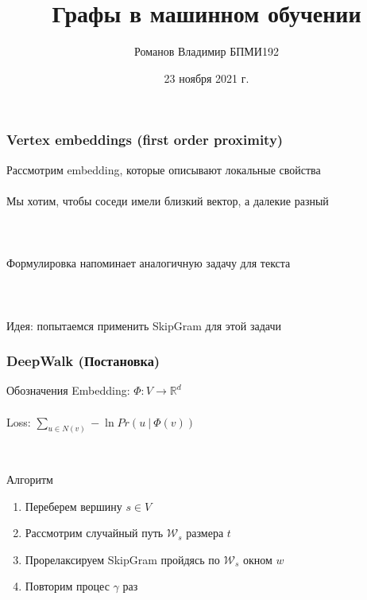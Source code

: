 \documentclass{beamer}
\title{Графы в машинном обучении}
\author[Романов Владимир]{Романов Владимир БПМИ192}
\institute[ВШЭ]{Национальный исследовательский университет \\ «Высшая школа экономики» (Москва)}
\date{23 ноября 2021 г.}
\newcommand{\R}{\mathbb{R}}
\newcommand{\skipline}[0]{$ $\\}
\begin{document}
\frame{\titlepage}





\begin{frame}
    \frametitle{Vertex embeddings (first order proximity)}
    Рассмотрим embedding, которые описывают локальные свойства
    \skipline
    \skipline
    Мы хотим, чтобы соседи имели близкий вектор, а далекие разный
    \skipline
    \skipline
    \skipline
    \skipline
    Формулировка напоминает аналогичную задачу для текста
    \skipline
    \skipline
    \skipline
    \skipline
    Идея: попытаемся применить SkipGram для этой задачи
\end{frame}

\begin{frame}
    \frametitle{DeepWalk (Постановка)}

    \begin{block}{Обозначения}
        Embedding: $\varPhi: V \to \R^d$ 
        \skipline
        \skipline
        Loss: $\sum_{u \in N(v)} -\ln Pr\left(u \ \vert\ \varPhi(v)\right)$
    \end{block}
    \skipline
    \begin{block}{Алгоритм}
        \begin{enumerate}
            \item Переберем вершину $s \in V$
            \item Рассмотрим случайный путь $\mathcal{W}_s$ размера $t$
            \item Прорелаксируем SkipGram пройдясь по $\mathcal{W}_s$ окном $w$
            \item Повторим процес $\gamma$ раз
        \end{enumerate}
    \end{block}
\end{frame}
\end{document}
